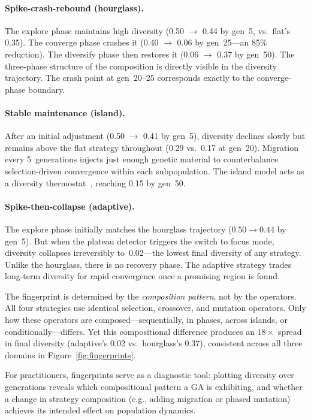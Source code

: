 \documentclass[dvipsnames,format=sigconf,anonymous=false,review=false]{acmart}
\begin{document}
\paragraph{Spike-crash-rebound (hourglass).}
The explore phase maintains high diversity (0.50 $\to$ 0.44 by gen~5, vs.\ flat's 0.35). The converge phase crashes it (0.40 $\to$ 0.06 by gen~25---an 85\% reduction). The diversify phase then restores it (0.06 $\to$ 0.37 by gen~50). The three-phase structure of the composition is directly visible in the diversity trajectory. The crash point at gen~20--25 corresponds exactly to the converge-phase boundary.

\paragraph{Stable maintenance (island).}
After an initial adjustment (0.50 $\to$ 0.41 by gen~5), diversity declines slowly but remains above the flat strategy throughout (0.29 vs.\ 0.17 at gen~20). Migration every 5~generations injects just enough genetic material to counterbalance selection-driven convergence within each subpopulation. The island model acts as a diversity thermostat~\cite{whitley1999island}, reaching 0.15 by gen~50.

\paragraph{Spike-then-collapse (adaptive).}
The explore phase initially matches the hourglass trajectory ($0.50 \to 0.44$ by gen~5). But when the plateau detector triggers the switch to focus mode, diversity collapses irreversibly to~0.02---the lowest final diversity of any strategy. Unlike the hourglass, there is no recovery phase. The adaptive strategy trades long-term diversity for rapid convergence once a promising region is found.

The fingerprint is determined by the \emph{composition pattern}, not by the operators.
All four strategies use identical selection, crossover, and mutation operators.
Only how these operators are composed---sequentially, in phases, across islands, or conditionally---differs.
Yet this compositional difference produces an $18\times$ spread in final diversity (adaptive's 0.02 vs.\ hourglass's 0.37), consistent across all three domains in Figure~\ref{fig:fingerprints}.

For practitioners, fingerprints serve as a diagnostic tool: plotting diversity over generations reveals which compositional pattern a GA is exhibiting, and whether a change in strategy composition (e.g., adding migration or phased mutation) achieves its intended effect on population dynamics.
\end{document}
